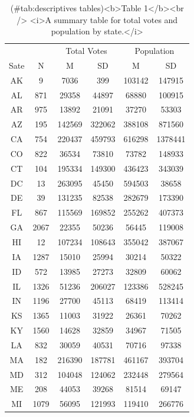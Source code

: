 \documentclass[
  english,
  man]{apa6}
\begin{document}
\begin{table}

\caption{(\#tab:descriptives tables)<b>Table 1</b><br /> <i>A summary table for total votes and population by state.</i>}
\centering
\begin{tabular}[t]{c|c|c|c|c|c}
\hline
\multicolumn{2}{c|}{ } & \multicolumn{2}{c|}{Total Votes} & \multicolumn{2}{c}{Population} \\
\cline{3-4} \cline{5-6}
Sate & N & M & SD & M & SD\\
\hline
AK & 9 & 7036 & 399 & 103142 & 147915\\
\hline
AL & 871 & 29358 & 44897 & 68880 & 100915\\
\hline
AR & 975 & 13892 & 21091 & 37270 & 53303\\
\hline
AZ & 195 & 142569 & 322062 & 388108 & 871560\\
\hline
CA & 754 & 220437 & 459793 & 616298 & 1378441\\
\hline
CO & 822 & 36534 & 73810 & 73782 & 148933\\
\hline
CT & 104 & 195334 & 149300 & 436423 & 343039\\
\hline
DC & 13 & 263095 & 45450 & 594503 & 38658\\
\hline
DE & 39 & 131235 & 82538 & 282679 & 173390\\
\hline
FL & 867 & 115569 & 169852 & 255262 & 407373\\
\hline
GA & 2067 & 22355 & 50236 & 56445 & 119008\\
\hline
HI & 12 & 107234 & 108643 & 355042 & 387067\\
\hline
IA & 1287 & 15010 & 25994 & 30214 & 50322\\
\hline
ID & 572 & 13985 & 27273 & 32809 & 60062\\
\hline
IL & 1326 & 51236 & 206027 & 123386 & 528245\\
\hline
IN & 1196 & 27700 & 45113 & 68419 & 113414\\
\hline
KS & 1365 & 11003 & 31922 & 26361 & 70262\\
\hline
KY & 1560 & 14628 & 32859 & 34967 & 71505\\
\hline
LA & 832 & 30059 & 40531 & 70716 & 97338\\
\hline
MA & 182 & 216390 & 187781 & 461167 & 393704\\
\hline
MD & 312 & 104048 & 124062 & 232448 & 279564\\
\hline
ME & 208 & 44053 & 39268 & 81514 & 69147\\
\hline
MI & 1079 & 56095 & 121993 & 119410 & 266776\\

\end{tabular}
\end{table}
\end{document}
